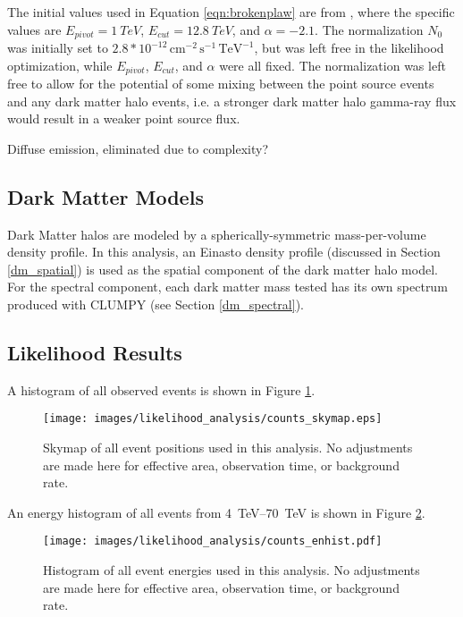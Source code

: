   
  The initial values used in Equation \ref{eqn:brokenplaw} are from \cite{VeritasGCRidge2015}, where the specific values are $E_{pivot}=\SI{1}{TeV}$, $E_{cut}=\SI{12.8}{TeV}$, and $\alpha=-2.1$.
  The normalization $N_{0}$ was initially set to $2.8*{10}^{-12}\,\text{cm}^{-2}\,\text{s}^{-1}\,\text{TeV}^{-1}$, but was left free in the likelihood optimization, while $E_{pivot}$, $E_{cut}$, and $\alpha$ were all fixed.
  The normalization was left free to allow for the potential of some mixing between the point source events and any dark matter halo events, i.e. a stronger dark matter halo gamma-ray flux would result in a weaker point source flux.
  
  Diffuse emission, eliminated due to complexity?

  \subsection{Dark Matter Models}
  Dark Matter halos are modeled by a spherically-symmetric mass-per-volume density profile.
  In this analysis, an Einasto density profile (discussed in Section \ref{dm_spatial}) is used as the spatial component of the dark matter halo model.
  For the spectral component, each dark matter mass tested has its own spectrum produced with CLUMPY (see Section \ref{dm_spectral}).

  \subsection{Likelihood Results}
  
  A histogram of all observed events is shown in Figure \ref{fig:gc_counts_skymap}.
  
  \begin{figure}[ht]
    \centering
    \texttt{[image: images/likelihood\_analysis/counts\_skymap.eps]}
    \caption[Galactic Center Counts Skymap]{
      Skymap of all event positions used in this analysis.
      No adjustments are made here for effective area, observation time, or background rate.
    }
    \label{fig:gc_counts_skymap}
  \end{figure}

  An energy histogram of all events from \SIrange{4}{70}{TeV} is shown in Figure \ref{fig:gc_counts_enhist}.
  
  \begin{figure}[ht]
    \centering
    \texttt{[image: images/likelihood\_analysis/counts\_enhist.pdf]}
    \caption[Galactic Center Counts Energy Histogram]{
      Histogram of all event energies used in this analysis.
      No adjustments are made here for effective area, observation time, or background rate.
    }
    \label{fig:gc_counts_enhist}
  \end{figure}

